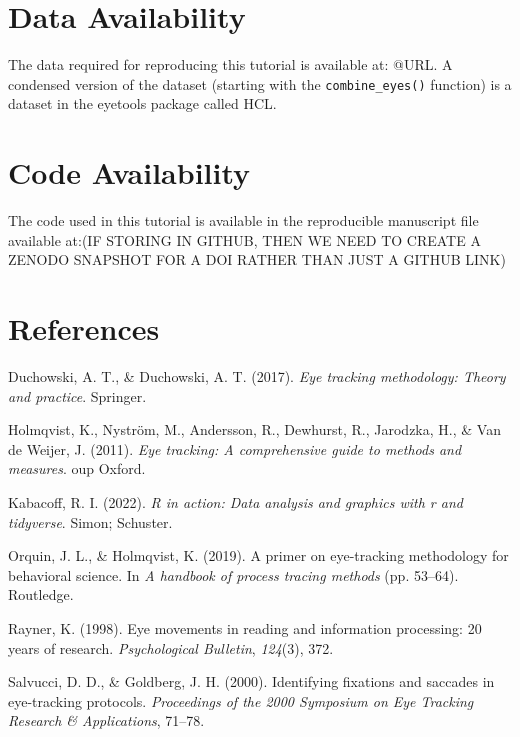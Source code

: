 \documentclass[
  man,
  floatsintext,
  longtable,
  nolmodern,
  notxfonts,
  notimes,
  colorlinks=true,linkcolor=blue,citecolor=blue,urlcolor=blue]{apa7}
\newlength{\cslhangindent}
\newenvironment{CSLReferences}[2] %
 {\begin{list}{}{%
  \setlength{\itemindent}{0pt}
  \setlength{\leftmargin}{0pt}
  \setlength{\parsep}{0pt}
  \ifodd #1
   \setlength{\leftmargin}{\cslhangindent}
   \setlength{\itemindent}{-1\cslhangindent}
  \fi
  \setlength{\itemsep}{#2\baselineskip}}}
 {\end{list}}
\begin{document}
\section{Data Availability}\label{data-availability}

The data required for reproducing this tutorial is available at: @URL. A
condensed version of the dataset (starting with the
\texttt{combine\_eyes()} function) is a dataset in the eyetools package
called HCL.

\section{Code Availability}\label{code-availability}

The code used in this tutorial is available in the reproducible
manuscript file available at:(IF STORING IN GITHUB, THEN WE NEED TO
CREATE A ZENODO SNAPSHOT FOR A DOI RATHER THAN JUST A GITHUB LINK)

\section{References}\label{references}

\label{refs}
\begin{CSLReferences}{1}{0}
Duchowski, A. T., \& Duchowski, A. T. (2017). \emph{Eye tracking
methodology: Theory and practice}. Springer.

Holmqvist, K., Nyström, M., Andersson, R., Dewhurst, R., Jarodzka, H.,
\& Van de Weijer, J. (2011). \emph{Eye tracking: A comprehensive guide
to methods and measures}. oup Oxford.

Kabacoff, R. I. (2022). \emph{R in action: Data analysis and graphics
with r and tidyverse}. Simon; Schuster.

Orquin, J. L., \& Holmqvist, K. (2019). A primer on eye-tracking
methodology for behavioral science. In \emph{A handbook of process
tracing methods} (pp. 53--64). Routledge.

Rayner, K. (1998). Eye movements in reading and information processing:
20 years of research. \emph{Psychological Bulletin}, \emph{124}(3), 372.

Salvucci, D. D., \& Goldberg, J. H. (2000). Identifying fixations and
saccades in eye-tracking protocols. \emph{Proceedings of the 2000
Symposium on Eye Tracking Research \& Applications}, 71--78.

\end{CSLReferences}
\end{document}
